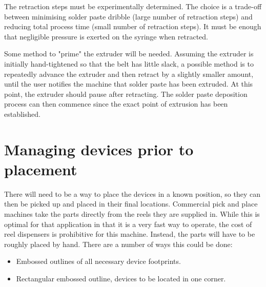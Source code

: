 The retraction steps must be experimentally determined. The choice is a trade-off between minimising solder paste dribble (large number
of retraction steps) and reducing total process time (small number of retraction steps). It must be enough that negligible pressure is
exerted on the syringe when retracted.

Some method to "prime" the extruder will be needed. Assuming the extruder is initially hand-tightened so that the belt has little slack,
a possible method is to repeatedly advance the extruder and then retract by a slightly smaller amount, until the user notifies the machine
that solder paste has been extruded. At this point, the extruder should pause after retracting. The solder paste deposition process can
then commence since the exact point of extrusion has been established. 

%
%
	  
\section{Managing devices prior to placement}
There will need to be a way to place the devices in a known position, so they can then be picked up and placed in their final locations.
Commercial pick and place machines take the parts directly from the reels they are supplied in. While this is optimal for that application in that
it is a very fast way to operate, the cost of reel dispensers is prohibitive for this machine. Instead, the parts will have to be roughly placed
by hand. There are a number of ways this could be done:

\begin{itemize} \itemsep0em
	\item	Embossed outlines of all necessary device footprints.
	\item	Rectangular embossed outline, devices to be located in one corner.
\end{itemize}

